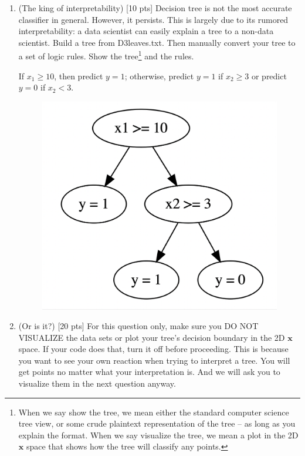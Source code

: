 \documentclass[a4paper]{article}
\theoremstyle{definition}
\def\x{\mathbf x}
\newenvironment{soln}{
    \leavevmode\color{blue}\ignorespaces
}{}
\begin{document}
\begin{enumerate}
\item (The king of interpretability)  [10 pts] Decision tree is not the most accurate classifier in general.  However, it persists.  This is largely due to its rumored interpretability: a data scientist can easily explain a tree to a non-data scientist.  Build a tree from D3leaves.txt.  Then manually convert your tree to a set of logic rules.  Show the tree\footnote{When we say show the tree, we mean either the standard computer science tree view, or some crude plaintext representation of the tree -- as long as you explain the format.  When we say visualize the tree, we mean a plot in the 2D $\x$ space that shows how the tree will classify any points.} and the rules. \\

\begin{soln}
  If $x_1 \geq 10$, then predict $y=1$; otherwise, predict $y=1$ if $x_2 \geq3$ or predict $y=0$ if $x_2 < 3$.
\end{soln}

\begin{figure}[htbp]
  \centerline{\includegraphics[scale=0.5]{Q4.png}}
\end{figure}

\pagebreak

\item (Or is it?)  [20 pts] For this question only, make sure you DO NOT VISUALIZE the data sets or plot your tree's decision boundary in the 2D $\x$ space.  If your code does that, turn it off before proceeding.  This is because you want to see your own reaction when trying to interpret a tree.  You will get points no matter what your interpretation is.
And we will ask you to visualize them in the next question anyway.
  \begin{itemize}
  

\end{itemize}
\end{enumerate}
\end{document}
